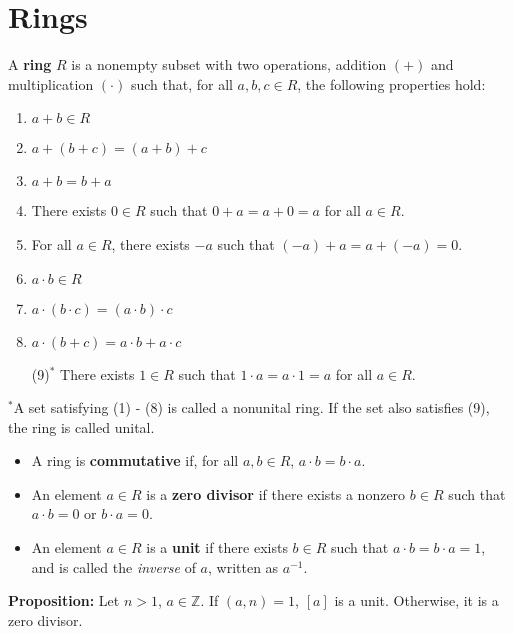 \documentclass [12pt] {article}
\newcommand{\Z}{\mathbb{Z}}
\newenvironment{definition}[1]{\begin{tcolorbox}[title={Definition: #1},colback=green!5!white,colframe=black!75!green]}{\end{tcolorbox}}
\renewcommand{\it}[1]{\textit{{#1}}}
\renewcommand{\bf}[1]{\textbf{{#1}}}
\begin{document}
\newpage
\section{Rings}
\begin{definition}{Ring}
    A \bf{ring} $R$ is a nonempty subset with two operations, addition $(+)$ and multiplication
    $(\cdot)$ such that, for all $a, b, c \in R$, the following properties hold:
    \begin{enumerate}[label=(\arabic*)]
        \item $a + b \in R$ 
        \item $a + (b + c) = (a + b) + c$
        \item $a + b = b + a$ 
        \item There exists $0 \in R$ such that $0 + a = a + 0 = a$ for all $a \in R$.
        \item For all $a \in R$, there exists $-a$ such that $(-a) + a = a + (-a) = 0$.
        \item $a \cdot b \in R$
        \item $a \cdot (b \cdot c) = (a \cdot b) \cdot c$
        \item $a \cdot (b + c) = a \cdot b + a \cdot c$
        \item[(9)$^*$] There exists $1 \in R$ such that $1 \cdot a = a \cdot 1 = a$ for all $a \in R$.
    \end{enumerate}
    $^*$A set satisfying (1) - (8) is called a nonunital ring. If the set also satisfies (9), the
    ring is called unital.

    \vspace{-0.5em}
    \begin{itemize}[label=$\to$, leftmargin=*, itemsep=0em]
        \item A ring is \bf{commutative} if, for all $a, b \in R$, $a \cdot b = b \cdot a$.
        \item An element $a \in R$ is a \bf{zero divisor} if there exists a nonzero $b \in R$ such 
            that $a \cdot b = 0$ or $b \cdot a = 0$.
        \item An element $a \in R$ is a \bf{unit} if there exists $b \in R$ such that 
            $a \cdot b = b \cdot a = 1$, and is called the \it{inverse} of $a$, written as $a^{-1}$.
    \end{itemize}
\end{definition}
\bf{Proposition:} Let $n > 1$, $a \in \Z$. If $(a, n) = 1$, $[a]$ is a unit. Otherwise, it is a 
zero divisor.
\end{document}
